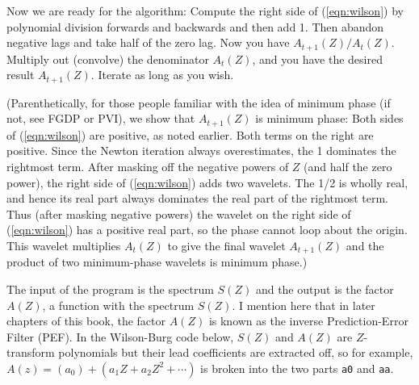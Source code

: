 Now we are ready for the algorithm:
Compute the right side of (\ref{eqn:wilson})
by polynomial division forwards and backwards and then add 1.
Then abandon negative lags and take half of the zero lag.
Now you have $A_{t+1}(Z) / A_t(Z)$.
Multiply out (convolve) the denominator $A_t(Z)$,
and you have the desired result $A_{t+1}(Z)$.
Iterate as long as you wish.
\par
(Parenthetically, for those people familiar with the idea
of minimum phase (if not, see FGDP or PVI),
we show that $A_{t+1}(Z)$ is minimum phase:
Both sides of (\ref{eqn:wilson}) are positive, as noted earlier.
Both terms on the right are positive.
Since the Newton iteration always overestimates,
the 1 dominates the rightmost term.
After masking off the negative powers of $Z$ (and half the zero power),
the right side of (\ref{eqn:wilson}) adds two wavelets.
The 1/2 is wholly real,
and hence its real part always dominates the real part of the rightmost term.
Thus (after masking negative powers) the wavelet on
the right side of  (\ref{eqn:wilson}) has a positive real part,
so the phase cannot loop about the origin.
This wavelet multiplies $A_t(Z)$ to give the final wavelet $A_{t+1}(Z)$
and the product of two minimum-phase wavelets is minimum phase.)
\par
\par
The input of the program is the spectrum $S(Z)$
and the output is the factor $A(Z)$,
a function with the spectrum $S(Z)$.
I mention here that in later chapters of this book,
the factor $A(Z)$ is known as the inverse Prediction-Error Filter (PEF).
In the Wilson-Burg code below,
$S(Z)$ and $A(Z)$ are $Z$-transform polynomials
but their lead coefficients are extracted off,
so for example, 
$A(z) = (a_0) + (a_1 Z + a_2 Z^2 + \cdots)$
is broken into the two parts \texttt{a0} and \texttt{aa}.
%
